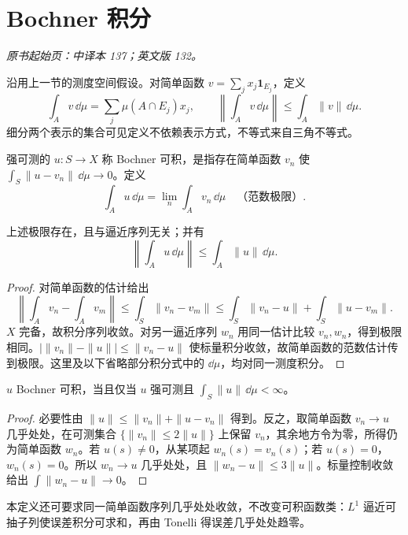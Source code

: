 \section{Bochner 积分}\label{sec:yosida-05-05}
\noindent\textit{原书起始页：中译本 137；英文版 132。}

沿用上一节的测度空间假设。对简单函数 $v=\sum_jx_j\mathbf1_{E_j}$，定义
\[
 \int_Av\,\dd\mu=\sum_j\mu(A\cap E_j)x_j,\qquad
 \left\|\int_Av\,\dd\mu\right\|\le\int_A\|v\|\,\dd\mu.
\]
细分两个表示的集合可见定义不依赖表示方式，不等式来自三角不等式。

\begin{definition}[Bochner 可积]
强可测的 $u:S\to X$ 称 Bochner 可积，是指存在简单函数 $v_n$ 使 $\int_S\|u-v_n\|\,\dd\mu\to0$。定义
\[
 \int_Au\,\dd\mu=\lim_n\int_Av_n\,\dd\mu\quad\text{（范数极限）}.
\]
\end{definition}

\begin{proposition}[定义的良定性]
上述极限存在，且与逼近序列无关；并有
\[
 \left\|\int_Au\,\dd\mu\right\|\le\int_A\|u\|\,\dd\mu.
\]
\end{proposition}
\begin{proof}
对简单函数的估计给出
\[
 \left\|\int_Av_n-\int_Av_m\right\|\le\int_S\|v_n-v_m\|
 \le\int_S\|v_n-u\|+\int_S\|u-v_m\|.
\]
$X$ 完备，故积分序列收敛。对另一逼近序列 $w_n$ 用同一估计比较 $v_n,w_n$，得到极限相同。$|\|v_n\|-\|u\||\le\|v_n-u\|$ 使标量积分收敛，故简单函数的范数估计传到极限。这里及以下省略部分积分式中的 $\dd\mu$，均对同一测度积分。
\end{proof}

\begin{theorem}\label{thm:y5-bochner}
$u$ Bochner 可积，当且仅当 $u$ 强可测且 $\int_S\|u\|\,\dd\mu<\infty$。
\end{theorem}
\begin{proof}
必要性由 $\|u\|\le\|v_n\|+\|u-v_n\|$ 得到。反之，取简单函数 $v_n\to u$ 几乎处处，在可测集合 $\{\|v_n\|\le2\|u\|\}$ 上保留 $v_n$，其余地方令为零，所得仍为简单函数 $w_n$。若 $u(s)\ne0$，从某项起 $w_n(s)=v_n(s)$；若 $u(s)=0$，$w_n(s)=0$。所以 $w_n\to u$ 几乎处处，且 $\|w_n-u\|\le3\|u\|$。标量控制收敛给出 $\int\|w_n-u\|\to0$。
\end{proof}

本定义还可要求同一简单函数序列几乎处处收敛，不改变可积函数类：$L^1$ 逼近可抽子列使误差积分可求和，再由 Tonelli 得误差几乎处处趋零。

